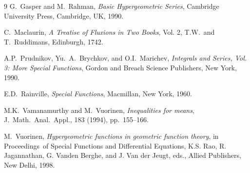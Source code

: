 \documentclass[final,oneeqnum]{siamltex}
\begin{document}
\begin{thebibliography}{9}
  {\sc G.\ Gasper and M.\ Rahman},  {\em Basic Hypergeometric Series},
Cambridge University Press, Cambridge, UK, 1990.

  {\sc C.\ Maclaurin}, {\em A Treatise of Fluxions in Two Books}, Vol.
2, {\rm T.W.\ and T.\ Ruddimans}, Edinburgh, 1742.

  {\sc A.P.\ Prudnikov, Yu.\ A.\ Brychkov, and O.I.\ Marichev}, {\em
Integrals and Series, Vol. {\rm 3:}  More Special Functions},
Gordon and Breach Science Publishers, New York, 1990.

  {\sc E.D.\ Rainville}, {\em Special Functions},  Macmillan, New York, 1960.

 {\sc M.K.\ Vamanamurthy and M.\ Vuorinen}, {\em Inequalities for means},
J.\ Math.\ Anal.\ Appl., 183 (1994), pp.\ 155--166.

  {\sc M.\ Vuorinen}, {\em Hypergeometric functions in geometric function
theory}, in Proceedings\ of Special Functions and
Differential Equations, {\rm K.S. Rao, R. Jagannathan, G. Vanden Berghe, and  J. Van der Jeugt}, 
eds., Allied Publishers, New Delhi, 1998.

\end{thebibliography}








\end{document}
